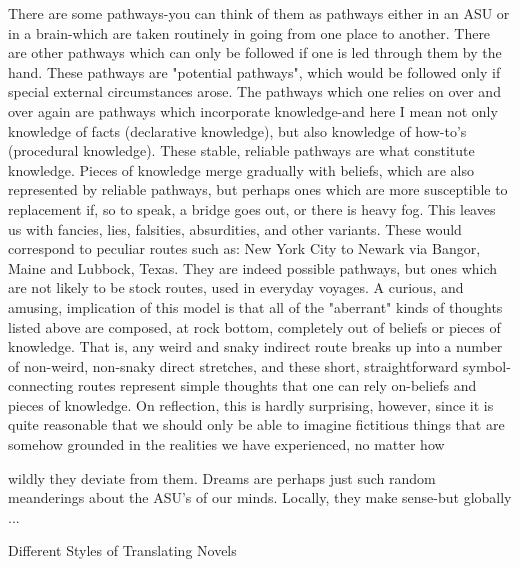 There are some pathways-you can think of them as pathways either in an ASU or in a
brain-which are taken routinely in going from one place to another. There are other
pathways which can only be followed if one is led through them by the hand. These
pathways are "potential pathways", which would be followed only if special external
circumstances arose. The pathways which one relies on over and over again are pathways
which incorporate knowledge-and here I mean not only knowledge of facts (declarative
knowledge), but also knowledge of how-to's (procedural knowledge). These stable,
reliable pathways are what constitute knowledge. Pieces of knowledge merge gradually
with beliefs, which are also represented by reliable pathways, but perhaps ones which are
more susceptible to replacement if, so to speak, a bridge goes out, or there is heavy fog.
This leaves us with fancies, lies, falsities, absurdities, and other variants. These would
correspond to peculiar routes such as: New York City to Newark via Bangor, Maine and
Lubbock, Texas. They are indeed possible pathways, but ones which are not likely to be
stock routes, used in everyday voyages.
         A curious, and amusing, implication of this model is that all of the "aberrant"
kinds of thoughts listed above are composed, at rock bottom, completely out of beliefs or
pieces of knowledge. That is, any weird and snaky indirect route breaks up into a number
of non-weird, non-snaky direct stretches, and these short, straightforward symbol-
connecting routes represent simple thoughts that one can rely on-beliefs and pieces of
knowledge. On reflection, this is hardly surprising, however, since it is quite reasonable
that we should only be able to imagine fictitious things that are somehow grounded in the
realities we have experienced, no matter how





wildly they deviate from them. Dreams are perhaps just such random meanderings about
the ASU's of our minds. Locally, they make sense-but globally ...


                         Different Styles of Translating Novels

